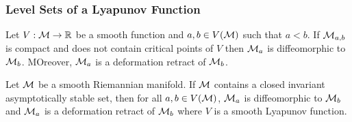 \begin{frame}
    \frametitle{Level Sets of a Lyapunov Function}

    \begin{theorem}
        Let $V: \mathcal{M} \rightarrow \mathbb{R}$ be a smooth function and $a, b
        \in V(\mathcal{M})$ such that $a < b$. If $\mathcal{M}_{a,b}$ is compact and does
        not contain critical points of $V$ then $\mathcal{M}_a$ is diffeomorphic to
        $\mathcal{M}_b$. MOreover, $\mathcal{M}_a$ is a deformation retract of $\mathcal{M}_b$.
    \end{theorem}

    \begin{corollary}
        Let $\mathcal{M}$ be a smooth Riemannian manifold. If $\mathcal{M}$ contains a
        closed invariant asymptotically stable set, then for all $a, b \in
        V(\mathcal{M})$, $\mathcal{M}_a$ is diffeomorphic to $\mathcal{M}_b$ and $\mathcal{M}_a$ is
        a deformation retract of $\mathcal{M}_b$ where $V$ is a smooth Lyapunov
        function.
    \end{corollary}
\end{frame}


\endgroup